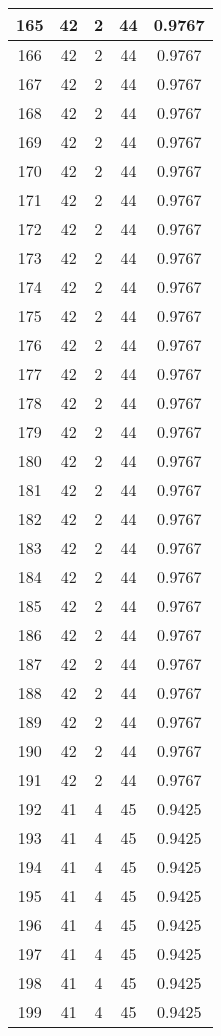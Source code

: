 \documentclass[letterpaper, 12pt]{article}
\begin{document}
\begin{longtable}{|c|c|c|c|c|}
\hline
165 & 42 & 2 & 44 & 0.9767 \\
\hline
166 & 42 & 2 & 44 & 0.9767 \\
\hline
167 & 42 & 2 & 44 & 0.9767 \\
\hline
168 & 42 & 2 & 44 & 0.9767 \\
\hline
169 & 42 & 2 & 44 & 0.9767 \\
\hline
170 & 42 & 2 & 44 & 0.9767 \\
\hline
171 & 42 & 2 & 44 & 0.9767 \\
\hline
172 & 42 & 2 & 44 & 0.9767 \\
\hline
173 & 42 & 2 & 44 & 0.9767 \\
\hline
174 & 42 & 2 & 44 & 0.9767 \\
\hline
175 & 42 & 2 & 44 & 0.9767 \\
\hline
176 & 42 & 2 & 44 & 0.9767 \\
\hline
177 & 42 & 2 & 44 & 0.9767 \\
\hline
178 & 42 & 2 & 44 & 0.9767 \\
\hline
179 & 42 & 2 & 44 & 0.9767 \\
\hline
180 & 42 & 2 & 44 & 0.9767 \\
\hline
181 & 42 & 2 & 44 & 0.9767 \\
\hline
182 & 42 & 2 & 44 & 0.9767 \\
\hline
183 & 42 & 2 & 44 & 0.9767 \\
\hline
184 & 42 & 2 & 44 & 0.9767 \\
\hline
185 & 42 & 2 & 44 & 0.9767 \\
\hline
186 & 42 & 2 & 44 & 0.9767 \\
\hline
187 & 42 & 2 & 44 & 0.9767 \\
\hline
188 & 42 & 2 & 44 & 0.9767 \\
\hline
189 & 42 & 2 & 44 & 0.9767 \\
\hline
190 & 42 & 2 & 44 & 0.9767 \\
\hline
191 & 42 & 2 & 44 & 0.9767 \\
\hline
192 & 41 & 4 & 45 & 0.9425 \\
\hline
193 & 41 & 4 & 45 & 0.9425 \\
\hline
194 & 41 & 4 & 45 & 0.9425 \\
\hline
195 & 41 & 4 & 45 & 0.9425 \\
\hline
196 & 41 & 4 & 45 & 0.9425 \\
\hline
197 & 41 & 4 & 45 & 0.9425 \\
\hline
198 & 41 & 4 & 45 & 0.9425 \\
\hline
199 & 41 & 4 & 45 & 0.9425 \\
\hline
\end{longtable}
\end{document}
